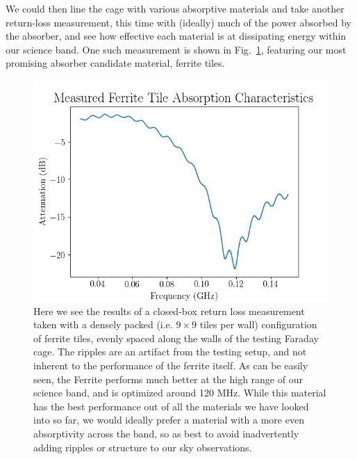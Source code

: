 We could then line the cage with various absorptive materials and take another 
return-loss measurement, this time with (ideally) much of the power absorbed by 
the absorber, and see how effective each material is at dissipating energy 
within our science band. One such measurement is shown in 
Fig.~\ref{fig:fe-absorption}, featuring our most promising absorber candidate 
material, ferrite tiles.

\begin{figure}
    \begin{center}
    \includegraphics[width=\linewidth]{fe_absorption.png}
    \end{center}
    \caption{
        Here we see the results of a closed-box return loss measurement taken 
        with a densely packed (i.e. $9\times9$ tiles per wall) configuration of 
        ferrite tiles, evenly spaced along the walls of the testing Faraday 
        cage. The ripples are an artifact from the testing setup, and not 
        inherent to the performance of the ferrite itself. As can be easily 
        seen, the Ferrite performs much better at the high range of our science 
        band, and is optimized around 120 MHz.  While this material has the 
        best performance out of all the materials we have looked into so far, 
        we would ideally prefer a material with a more even absorptivity across 
        the band, so as best to avoid inadvertently adding ripples or structure 
        to our sky observations.
    }
    \label{fig:fe-absorption}
\end{figure}

